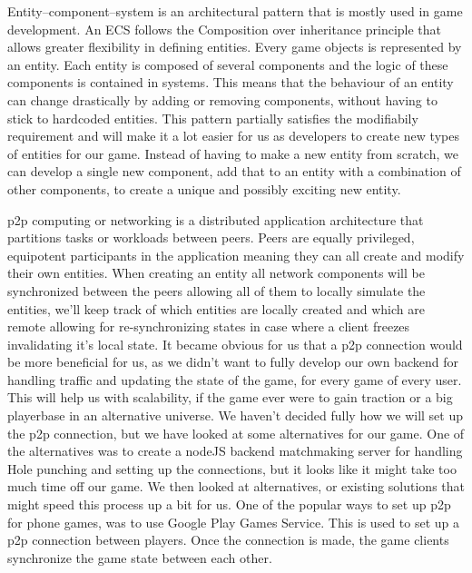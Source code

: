 Entity–component–system \cite{wiki:ecs} is an architectural pattern that is mostly used in game development. An ECS follows the Composition over inheritance principle that allows greater flexibility in defining entities.
Every game objects is represented by an entity. Each entity is composed of several components and the logic of these components is contained in systems. This means that the behaviour of an entity can change drastically by adding or removing components, without having to stick to hardcoded entities.
This pattern partially satisfies the modifiabily requirement and will make it a lot easier for us as developers to create new types of entities for our game. Instead of having to make a new entity from scratch, we can develop a single new component, add that to an entity with a combination of other components, to create a unique and possibly exciting new entity.

\gls{p2p} \cite{wiki:p2p} computing or networking is a distributed application architecture that partitions tasks or workloads between peers. Peers are equally privileged, equipotent participants in the application meaning they can all create and modify their own entities. When creating an entity all network components will be synchronized between the peers allowing all of them to locally simulate the entities, we'll keep track of which entities are locally created and which are remote allowing for re-synchronizing states in case where a client freezes invalidating it's local state.
It became obvious for us that a \gls{p2p} connection would be more beneficial for us, as we didn't want to fully develop our own backend for handling traffic and updating the state of the game, for every game of every user. This will help us with scalability, if the game ever were to gain traction or a big playerbase in an alternative universe.
We haven't decided fully how we will set up the \gls{p2p} connection, but we have looked at some alternatives for our game.
One of the alternatives was to create a nodeJS backend matchmaking server for handling Hole punching\cite{wiki:holePunching} and setting up the connections, but it looks like it might take too much time off our game. We then looked at alternatives, or existing solutions that might speed this process up a bit for us.
One of the popular ways to set up p2p for phone games, was to use Google Play Games Service. This is used to set up a \gls{p2p} connection between players. Once the connection is made, the game clients synchronize the game state between each other.

